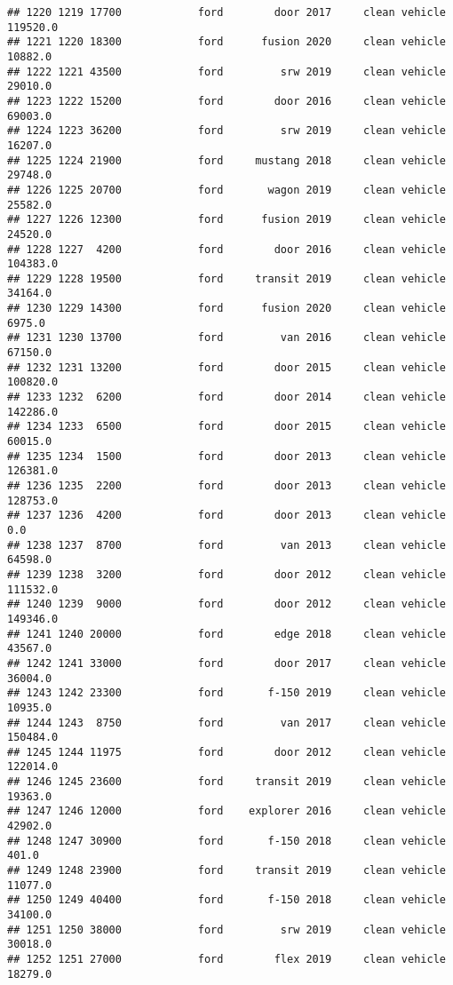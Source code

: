 \documentclass[
]{article}
\begin{document}
\begin{verbatim}
## 1220 1219 17700            ford        door 2017     clean vehicle  119520.0
## 1221 1220 18300            ford      fusion 2020     clean vehicle   10882.0
## 1222 1221 43500            ford         srw 2019     clean vehicle   29010.0
## 1223 1222 15200            ford        door 2016     clean vehicle   69003.0
## 1224 1223 36200            ford         srw 2019     clean vehicle   16207.0
## 1225 1224 21900            ford     mustang 2018     clean vehicle   29748.0
## 1226 1225 20700            ford       wagon 2019     clean vehicle   25582.0
## 1227 1226 12300            ford      fusion 2019     clean vehicle   24520.0
## 1228 1227  4200            ford        door 2016     clean vehicle  104383.0
## 1229 1228 19500            ford     transit 2019     clean vehicle   34164.0
## 1230 1229 14300            ford      fusion 2020     clean vehicle    6975.0
## 1231 1230 13700            ford         van 2016     clean vehicle   67150.0
## 1232 1231 13200            ford        door 2015     clean vehicle  100820.0
## 1233 1232  6200            ford        door 2014     clean vehicle  142286.0
## 1234 1233  6500            ford        door 2015     clean vehicle   60015.0
## 1235 1234  1500            ford        door 2013     clean vehicle  126381.0
## 1236 1235  2200            ford        door 2013     clean vehicle  128753.0
## 1237 1236  4200            ford        door 2013     clean vehicle       0.0
## 1238 1237  8700            ford         van 2013     clean vehicle   64598.0
## 1239 1238  3200            ford        door 2012     clean vehicle  111532.0
## 1240 1239  9000            ford        door 2012     clean vehicle  149346.0
## 1241 1240 20000            ford        edge 2018     clean vehicle   43567.0
## 1242 1241 33000            ford        door 2017     clean vehicle   36004.0
## 1243 1242 23300            ford       f-150 2019     clean vehicle   10935.0
## 1244 1243  8750            ford         van 2017     clean vehicle  150484.0
## 1245 1244 11975            ford        door 2012     clean vehicle  122014.0
## 1246 1245 23600            ford     transit 2019     clean vehicle   19363.0
## 1247 1246 12000            ford    explorer 2016     clean vehicle   42902.0
## 1248 1247 30900            ford       f-150 2018     clean vehicle     401.0
## 1249 1248 23900            ford     transit 2019     clean vehicle   11077.0
## 1250 1249 40400            ford       f-150 2018     clean vehicle   34100.0
## 1251 1250 38000            ford         srw 2019     clean vehicle   30018.0
## 1252 1251 27000            ford        flex 2019     clean vehicle   18279.0

\end{verbatim}
\end{document}
